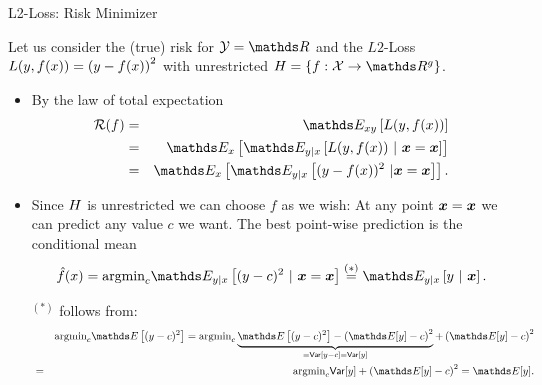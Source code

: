 \begin{vbframe}{L2-Loss: Risk Minimizer}

Let us consider the (true) risk for  $\Yspace = \R$ and the $L2$-Loss $L(y, f(x)) = \left(y-f(x)\right)^2$ with unrestricted $\Hspace = \{f: \Xspace \to \R^g\}$. 

\begin{itemize}
\item By the law of total expectation
  \begin{eqnarray*}
    \riskf &=& \E_{xy} \left[\Lxy\right] 
    \\ &=& \E_x \left[\E_{y|x}\left[\Lxy~|~\xv = \xv\right]\right] \\
  &=& \E_x
  \left[\E_{y|x}\left[(y-\fx)^2~|\xv = \xv\right]\right]. 
  \end{eqnarray*}

\item Since $H$ is unrestricted we can choose $f$ as we wish: At any point $\bm{x} = \bm{x}$ we can predict any value $c$ we want. The best point-wise prediction is the conditional mean
$$
  \fxh = \mbox{argmin}_c \E_{y|x}\left[(y - c)^2 ~|~ \xv = \xv \right]\overset{(*)}{=} \E_{y|x} \left[y ~|~ \xv \right]. 
$$

\begin{footnotesize}
$^{(*)}$ follows from:
  \begin{eqnarray*}
  && \mbox{argmin}_c \E\left[(y - c)^2\right] = \mbox{argmin}_c \underbrace{\E\left[(y - c)^2\right] - \left(\E[y] - c\right)^2}_{= \var[y - c] = \var[y]} + \left(\E[y] - c\right)^2 \\ &=& \mbox{argmin}_c \var[y] + \left(\E[y] - c\right)^2 = \E[y]. 
  \end{eqnarray*}
\end{footnotesize}

\end{itemize}


\end{vbframe}

